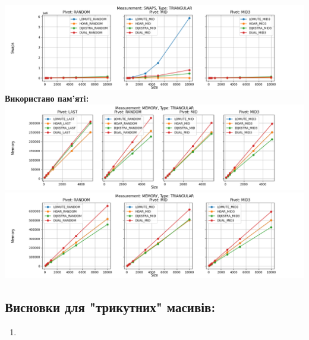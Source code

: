 \documentclass{article}
\begin{document}
        \includegraphics[scale=0.5]{triangular_Swaps_3_pivots_7_numbers.png}
        \newline
    \newpage
    \textbf{Використано пам’ятi:}
    \newline
        \includegraphics[scale=0.5]{triangular_Memory_6_numbers.png}
        \includegraphics[scale=0.5]{triangular_Memory_3_pivots_7_numbers.png}
    \subsection{Висновки для "трикутних" масивів:}
    \begin{enumerate}
        \item 
    \end{enumerate}
    \newpage
\end{document}
